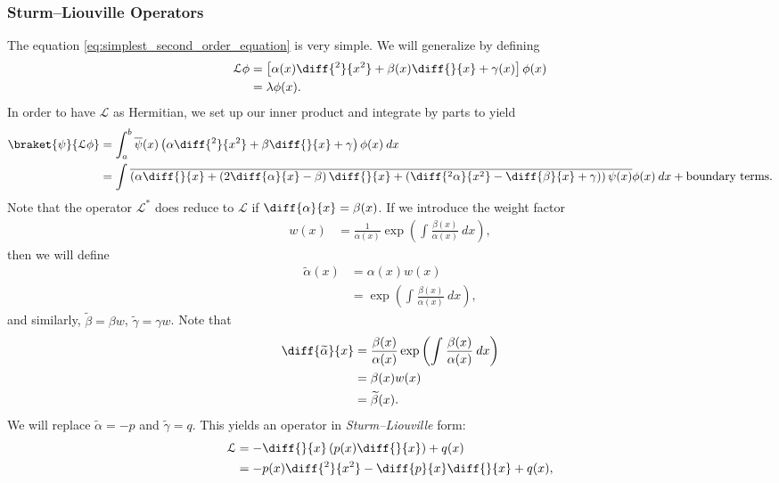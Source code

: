 \documentclass[10pt]{mypackage}
\begin{document}
  \subsubsection{Sturm--Liouville Operators}%
  The equation \eqref{eq:simplest_second_order_equation} is very simple. We will generalize by defining
  \begin{align*}
    \mathcal{L}\phi &= \left[ \alpha(x)\diff{^2}{x^2} + \beta(x)\diff{}{x} + \gamma(x) \right]\phi(x)\\
                    &= \lambda\phi(x).
  \end{align*}
  In order to have $\mathcal{L}$ as Hermitian, we set up our inner product and integrate by parts to yield
  \begin{align*}
    \braket{\psi}{\mathcal{L}\phi} &= \int_{a}^{b} \overline{\psi}(x)\left( \alpha\diff{^2}{x^2} + \beta \diff{}{x} + \gamma \right)\phi(x)\:dx\\
                                   &= \int_{}^{} \overline{\left( \alpha \diff{}{x} + \left( 2\diff{\alpha}{x} - \beta \right)\diff{}{x} + \left( \diff{^2\alpha}{x^2} - \diff{\beta}{x} + \gamma \right) \right)\psi(x)}\phi(x)\:dx + \text{boundary terms}.
  \end{align*}
  Note that the operator $\mathcal{L}^{\ast}$ does reduce to $\mathcal{L}$ if $\diff{\alpha}{x} = \beta(x)$. If we introduce the weight factor
  \begin{align*}
    w(x) &= \frac{1}{\alpha(x)} \exp\left( \int_{}^{} \frac{\beta(x)}{\alpha(x)}\:dx \right),
  \end{align*}
  then we will define
  \begin{align*}
    \widetilde{\alpha}(x) &= \alpha(x)w(x)\\
                          &= \exp\left( \int_{}^{} \frac{\beta(x)}{\alpha(x)}\:dx \right),
  \end{align*}
  and similarly, $\widetilde{\beta} = \beta w$, $\widetilde{\gamma} = \gamma w$. Note that
  \begin{align*}
    \diff{\widetilde{\alpha}}{x} &= \frac{\beta(x)}{\alpha(x)} \exp\left( \int_{}^{} \frac{\beta(x)}{\alpha(x)}\:dx \right)\\
                                 &= \beta(x)w(x)\\
                                 &= \widetilde{\beta}(x).
  \end{align*}
  We will replace $\widetilde{\alpha} = -p$ and $\widetilde{\gamma} = q$. This yields an operator in \textit{Sturm--Liouville} form:
  \begin{align*}
    \mathcal{L} &= -\diff{}{x}\left( p(x)\diff{}{x} \right) + q(x)\\
                &= -p(x)\diff{^2}{x^2} - \diff{p}{x}\diff{}{x} + q(x),
  \end{align*}
\end{document}

